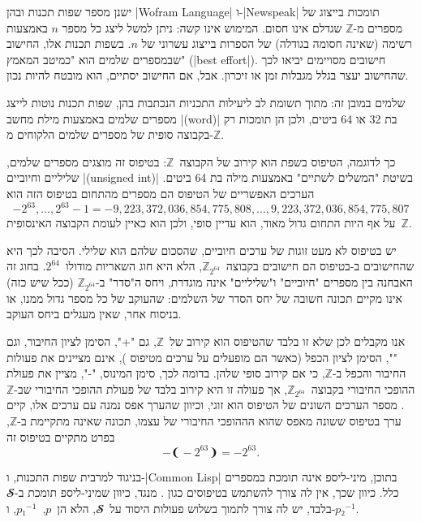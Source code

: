 ישנן מספר שפות תכנות ובהן \E|Wofram Language| ו-\E|Newspeak| תומכות בייצוג של
מספרים מ-$ℤ$ שגדלם אינו חסום. המימוש אינו קשה: ניתן למשל ליצג כל מספר $n$ 
באמצעות רשימה (שאינה חסומה בגודלה) של הספרות בייצוג עשרוני של $n$. 
בשפות תכנות אלו, החישוב שבמספרים שלמים הוא "כמיטב המאמץ" (\E|best effort|).
חישובים מסויימים יביאו לכך שהחישוב יעצר בגלל מגבלות זמן או
זיכרון. אבל, אם החישוב יסתיים, הוא מובטח להיות נכון. 

שלמים במובן זה:  מתוך תשומת לב ליעילות התכניות הנכתבות בהן, שפות תכנות נוטות
לייצג מספרים שלמים באמצעות מילת מחשב \E|(word)| בת 32 או 64 ביטים, ולכן הן
תומכות רק בקבוצה סופית של מספרים שלמים הלקוחים מ-$ℤ$.

כך לדוגמה, הטיפוס  בשפת \Java הוא קירוב של הקבוצה~$ℤ$: בטיפוס זה מוצגים
מספרים שלמים, שליליים וחיוביים \E|(unsigned int)| בשיטת "המשלים לשתיים" באמצעות מילה בת
64 ביטים.
הערכים האפשריים של הטיפוס  הם מספרים מהתחום
בטיפוס הזה הוא \begin{equation}
-2^{63},…,2^{63}-1=-9,223,372,036,854,775,808,…,9,223,372,036,854,775,807
\end{equation}
על אף היות התחום גדול מאוד, הוא עדיין סופי, ולכן הוא כאיין לעומת
הקבוצה האינסופית~$ℤ$.

יש בטיפוס  לא מעט זוגות של ערכים חיוביים, שהסכום שלהם הוא שלילי.
הסיבה לכך היא שהחישובים ב-\Java בטיפוס  הם חישובים
בקבוצה~$ℤ_{2^{64}}$, הלא היא חוג השאריות מודולו~$2^{64}$. בחוג זה האבחנה בין
מספרים "חיוביים" ו"שליליים" אינה מוגדרת, ויחס ה"סדר" ב-$ℤ_{2^{64}}$ (ככל שיש
כזה) אינו מקיים תכונה חשובה של יחס הסדר של השלמים: שהעוקב של כל מספר גדול ממנו,
או בניסוח אחר, שאין מעגלים ביחס העוקב.

אנו מקבלים לכן שלא זו בלבד שהטיפוס  הוא קירוב של~$ℤ$, גם "\cc+",
הסימן לציון החיבור, וגם "\cc*", הסימן לציון הכפל \Java (כאשר הם מופעלים על
ערכים מטיפוס ), אינם מציינים את פעולות החיבור והכפל ב-$ℤ$, כי אם
קירוב סופי שלהן. בדומה לכך, סימן המינוס, "\cc-", מציין את פעולת ההופכי החיבורי
בקבוצה~$ℤ_{2^{64}}$, אך פעולה זו היא קירוב בלבד של פעולת ההופכי החיבורי שב-$ℤ$.
מספר הערכים השונים של הטיפוס  הוא זוגי, וכיוון שהערך אפס נמנה עם ערכים
אלו, קיים ערך בטיפוס ששונה מאפס שהוא הההופכי החיבורי של עצמו, תכונה שאינה
מתקיימת ב-$ℤ$, בפרט מתקיים בטיפוס זה
\begin{equation*}
-❨-2^{63}❩=-2^{63}.
\end{equation*}

בניגוד למרבית שפות התכנות, ו-\E|Common Lisp| בתוכן, מיני-ליספ אינה תומכת
במספרים כלל. כיוון שכך, אין לה צורך להשתמש בטיפוסים כגון . מנגד,
כיוון שמיני-ליספ תומכת ב-$𝓢$ בלבד, יש לה צורך לתמוך בשלוש פעולות היסוד
על~$𝓢$, הלא הן~$p$,~$p₁^{-1}$, ו-$p₂^{-1}$.


